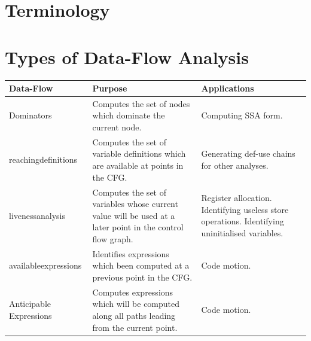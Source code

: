 \documentclass[bsc,twoside,singlespacing,parskip,logo,notimes,normalheadings]{infthesis}
\begin{document}
\begin{appendices}

\chapter{Terminology}\label{appx:glossary}

\printglossaries

\chapter{Types of Data-Flow Analysis}\label{appx:analysistypes}

\bgroup
  \vspace{-5mm}
  \begin{tabular}{|l|p{5cm}|p{5cm}|}
    \hline
    {\bf Data-Flow}                         & {\bf Purpose}                                                                                              & {\bf Applications}                                                                              \\ \hline
    Dominators                              & Computes the set of nodes which \gls{dominate} the current node.                                           & Computing SSA form.                                                                             \\ \hline
    \Gls{reachingdefinition}s               & Computes the set of variable definitions which are available at points in the CFG.                         & Generating def-use chains for other analyses.                                                   \\ \hline
    \Gls{livenessanalysis}                  & Computes the set of variables whose current value will be used at a later point in the control flow graph. & Register allocation. Identifying useless store operations. Identifying uninitialised variables. \\ \hline
    \Gls{availableexpression}s              & Identifies expressions which been computed at a previous point in the CFG.                                 & Code motion.                                                                                    \\ \hline
    Anticipable Expressions                 & Computes expressions which will be computed along all paths leading from the current point.                & Code motion.                                                                                    \\ \hline

\end{tabular}
\end{appendices}
\end{document}
